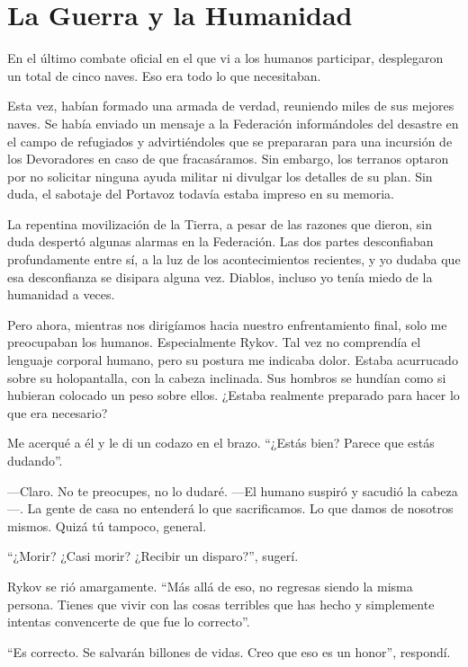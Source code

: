 \chapter{La Guerra y la Humanidad}\label{sec:la-guerra-y-la-humanidad}

En el último combate oficial en el que vi a los humanos participar, desplegaron un total de cinco naves. Eso era todo lo que necesitaban.

Esta vez, habían formado una armada de verdad, reuniendo miles de sus mejores naves. Se había enviado un mensaje a la Federación informándoles del desastre en el campo de refugiados y advirtiéndoles que se prepararan para una incursión de los Devoradores en caso de que fracasáramos. Sin embargo, los terranos optaron por no solicitar ninguna ayuda militar ni divulgar los detalles de su plan. Sin duda, el sabotaje del Portavoz todavía estaba impreso en su memoria.

La repentina movilización de la Tierra, a pesar de las razones que dieron, sin duda despertó algunas alarmas en la Federación. Las dos partes desconfiaban profundamente entre sí, a la luz de los acontecimientos recientes, y yo dudaba que esa desconfianza se disipara alguna vez. Diablos, incluso yo tenía miedo de la humanidad a veces.

Pero ahora, mientras nos dirigíamos hacia nuestro enfrentamiento final, solo me preocupaban los humanos. Especialmente Rykov. Tal vez no comprendía el lenguaje corporal humano, pero su postura me indicaba dolor. Estaba acurrucado sobre su holopantalla, con la cabeza inclinada. Sus hombros se hundían como si hubieran colocado un peso sobre ellos. ¿Estaba realmente preparado para hacer lo que era necesario?

Me acerqué a él y le di un codazo en el brazo. ``¿Estás bien? Parece que estás dudando''.

—Claro. No te preocupes, no lo dudaré. —El humano suspiró y sacudió la cabeza—. La gente de casa no entenderá lo que sacrificamos. Lo que damos de nosotros mismos. Quizá tú tampoco, general.

``¿Morir? ¿Casi morir? ¿Recibir un disparo?'', sugerí.

Rykov se rió amargamente. ``Más allá de eso, no regresas siendo la misma persona. Tienes que vivir con las cosas terribles que has hecho y simplemente intentas convencerte de que fue lo correcto''.

``Es correcto. Se salvarán billones de vidas. Creo que eso es un honor'', respondí.

